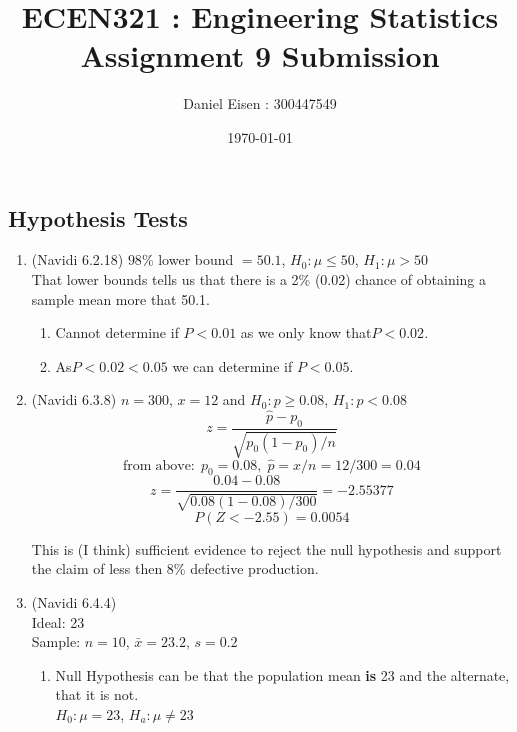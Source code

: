 \documentclass[11pt]{article}
\title{ECEN321 : Engineering Statistics \\ Assignment 9 Submission}
\author{Daniel Eisen : 300447549}
\date{\today}
\begin{document}
\begin{preview}
\maketitle
\section*{Hypothesis Tests}
\begin{enumerate}
        \item (Navidi 6.2.18) $98\%$ lower bound $= 50.1$, $H_0: \mu \le 50$, $H_1: \mu > 50$ \\
        That lower bounds tells us that there is a 2\% (0.02) chance of obtaining a sample mean more that 50.1.
        \begin{enumerate}
                \item Cannot determine if $P<0.01$ as we only know that$ P < 0.02$.
                \item As$ P < 0.02 < 0.05$ we can determine if $P < 0.05$.
        \end{enumerate}
        \item (Navidi 6.3.8) $n=300$, $x=12$ and $H_0: p \ge 0.08$, $H_1: p < 0.08$ \\

        $$z = \frac{\hat{p} - p_0}{\sqrt{p_0(1-p_0)/n}}$$
        $$\mathrm{from\;above: \;}p_0 = 0.08,\; \hat{p} = x/n = 12/300=0.04$$
        $$z = \frac{0.04-0.08}{\sqrt{0.08(1-0.08)/300}}=-2.55377$$
        $$P(Z<-2.55) = 0.0054$$

        This is (I think) sufficient evidence to reject the null hypothesis and support the claim of less then 8\% defective production.

        \item (Navidi 6.4.4) \\
        Ideal: 23 \\
        Sample: $n = 10$, $\bar{x}=23.2$, $s=0.2$
        \begin{enumerate}
                \item Null Hypothesis can be that the population mean \textbf{is} 23 and the alternate, that it is not. \\
                $H_0: \mu = 23$, $H_a: \mu \ne 23$ \\


\end{enumerate}
\end{enumerate}
\end{preview}
\end{document}
